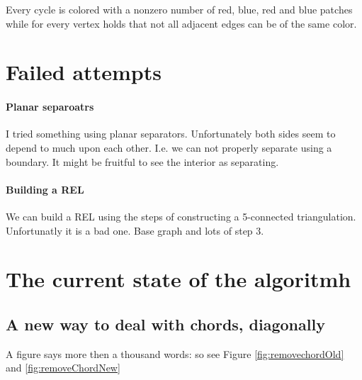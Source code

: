   Every cycle is colored with a nonzero number of red, blue, red and blue patches while for every vertex holds that not all adjacent edges can be of the same color.




\section{Failed attempts}
\paragraph{Planar separoatrs}
I tried something using planar separators. Unfortunately both sides seem to depend to much upon each other. I.e. we can not properly separate using a boundary. It might be fruitful to see the interior as separating.


\paragraph{Building a REL}
We can build a REL using the steps of constructing a 5-connected triangulation. Unfortunatly it is a bad one.
Base graph and lots of step 3.

\section{The current state of the algoritmh}



\subsection{A new way to deal with chords, diagonally}
A figure says more then a thousand words: so see Figure \ref{fig:removechordOld} and \ref{fig:removeChordNew}

